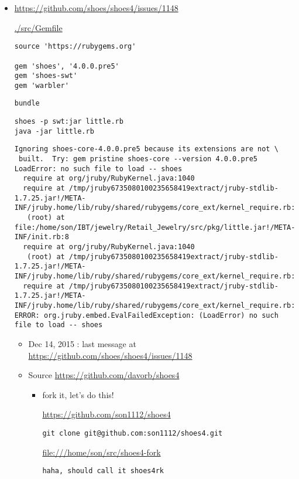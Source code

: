 \documentclass[11pt]{article}
\begin{document}
\begin{itemize}
\begin{itemize}
\begin{itemize}
\begin{itemize}
\item \url{https://github.com/shoes/shoes4/issues/1148}

\url{./src/Gemfile}

\begin{verbatim}
source 'https://rubygems.org'

gem 'shoes', '4.0.0.pre5'
gem 'shoes-swt'
gem 'warbler'
\end{verbatim}

\begin{verbatim}
bundle
\end{verbatim}

\begin{verbatim}
shoes -p swt:jar little.rb
java -jar little.rb
\end{verbatim}

\begin{verbatim}
Ignoring shoes-core-4.0.0.pre5 because its extensions are not \
 built.  Try: gem pristine shoes-core --version 4.0.0.pre5
LoadError: no such file to load -- shoes
  require at org/jruby/RubyKernel.java:1040
  require at /tmp/jruby6735080100235658419extract/jruby-stdlib-1.7.25.jar!/META-INF/jruby.home/lib/ruby/shared/rubygems/core_ext/kernel_require.rb:54
   (root) at file:/home/son/IBT/jewelry/Retail_Jewelry/src/pkg/little.jar!/META-INF/init.rb:8
  require at org/jruby/RubyKernel.java:1040
   (root) at /tmp/jruby6735080100235658419extract/jruby-stdlib-1.7.25.jar!/META-INF/jruby.home/lib/ruby/shared/rubygems/core_ext/kernel_require.rb:1
  require at /tmp/jruby6735080100235658419extract/jruby-stdlib-1.7.25.jar!/META-INF/jruby.home/lib/ruby/shared/rubygems/core_ext/kernel_require.rb:54
ERROR: org.jruby.embed.EvalFailedException: (LoadError) no such file to load -- shoes
\end{verbatim}

\begin{itemize}
\item Dec 14, 2015 : last message at \url{https://github.com/shoes/shoes4/issues/1148}

\item Source \url{https://github.com/davorb/shoes4}

\begin{itemize}
\item fork it, let's do this!

\url{https://github.com/son1112/shoes4}

\begin{verbatim}
git clone git@github.com:son1112/shoes4.git
\end{verbatim}

\url{file:///home/son/src/shoes4-fork}

\begin{verbatim}
haha, should call it shoes4rk
\end{verbatim}
\end{itemize}
\end{itemize}
\end{itemize}
\end{itemize}
\end{itemize}
\end{itemize}
\end{document}

